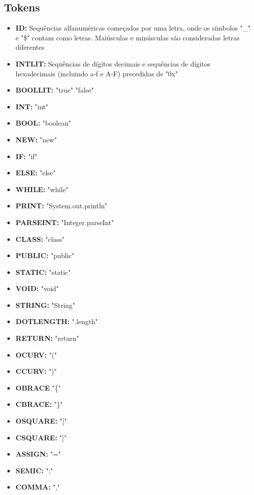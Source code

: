 \documentclass[12pt]{article}
\begin{document}
\subsection{Tokens}
\begin{itemize}
	        \item \textbf{ID:} Sequências alfanuméricas começadas por uma letra, onde os símbolos "\_" e "\$" contam como letras. Maiúsculas e minúsculas são consideradas letras diferentes 
	        \item \textbf{INTLIT:} Sequências de dígitos decimais e sequências de dígitos hexadecimais (incluindo a-f e A-F) precedidas de "0x"
	        \item \textbf{BOOLLIT:} "true" \text{\textbar} "false" 
	        \item \textbf{INT:} "int"
	        \item \textbf{BOOL:} "boolean"
	        \item \textbf{NEW:} "new"
	        \item \textbf{IF:} "if"
	        \item \textbf{ELSE:} "else"
	        \item \textbf{WHILE:} "while"
	        \item \textbf{PRINT:} "System.out.println"
	        \item \textbf{PARSEINT:} "Integer.parseInt"
	        \item \textbf{CLASS:} "class"
	        \item \textbf{PUBLIC:} "public"
	        \item \textbf{STATIC:} "static"
	        \item \textbf{VOID:} "void"
	        \item \textbf{STRING:} "String"
	        \item \textbf{DOTLENGTH:} ".length"
	        \item \textbf{RETURN:} "return"
	        \item \textbf{OCURV:} "("
	        \item \textbf{CCURV:} ")"
	        \item \textbf{OBRACE} "\{"
	        \item \textbf{CBRACE:} "\}"
	        \item \textbf{OSQUARE:} "["
	        \item \textbf{CSQUARE:} "]"	 
	        \item \textbf{ASSIGN:} "="
	        \item \textbf{SEMIC:} ";"
	        \item \textbf{COMMA:} ","
	      \end{itemize}
	      
\end{document}
